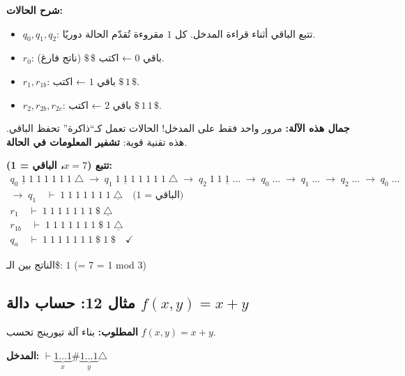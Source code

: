 \documentclass[14pt]{extarticle}
\begin{document}
\textbf{شرح الحالات:}
\begin{itemize}
    \item $q_0, q_1, q_2$: تتبع الباقي أثناء قراءة المدخل. كل $1$ مقروءة تُقدّم الحالة دوريًا.
    \item $r_0$: باقي $0$ ← اكتب $\$\,\$$ (ناتج فارغ).
    \item $r_1, r_{1b}$: باقي $1$ ← اكتب $\$\,1\,\$$.
    \item $r_2, r_{2b}, r_{2c}$: باقي $2$ ← اكتب $\$\,1\,1\,\$$.
\end{itemize}

\begin{boxNote}
\textbf{جمال هذه الآلة:} مرور واحد فقط على المدخل! الحالات تعمل كـ``ذاكرة'' تحفظ الباقي. هذه تقنية قوية: \textbf{تشفير المعلومات في الحالة}.
\end{boxNote}

\textbf{تتبع ($x = 7$، الباقي = 1):}
\begin{align*}
q_0 \; \underline{1} \; 1 \; 1 \; 1 \; 1 \; 1 \; 1 \; \triangle \;\to\;
q_1 \; 1 \; \underline{1} \; 1 \; 1 \; 1 \; 1 \; 1 \; \triangle \;\to\;
q_2 \; 1 \; 1 \; \underline{1} \; \ldots \;\to\;
q_0 \; \ldots \;\to\; q_1 \; \ldots \;\to\; q_2 \; \ldots \;\to\; q_0 \; \ldots \\
\to\; q_1 \quad \vdash \; 1 \; 1 \; 1 \; 1 \; 1 \; 1 \; 1 \; \underline{\triangle} \quad \text{(الباقي = 1)} \\
r_1 \quad \vdash \; 1 \; 1 \; 1 \; 1 \; 1 \; 1 \; 1 \; \$ \; \underline{\triangle} \\
r_{1b} \quad \vdash \; 1 \; 1 \; 1 \; 1 \; 1 \; 1 \; 1 \; \$ \; 1 \; \underline{\triangle} \\
q_a \quad \vdash \; 1 \; 1 \; 1 \; 1 \; 1 \; 1 \; 1 \; \$ \; 1 \; \$ \quad \checkmark
\end{align*}

الناتج بين الـ\$: $1$ (= 1 = 7 mod 3) \checkmark

\clearpage

\subsection{مثال 12: حساب دالة $f(x,y) = x + y$}

\textbf{المطلوب:} بناء آلة تيورينج تحسب $f(x, y) = x + y$.

\textbf{المدخل:} $\vdash \underbrace{1\ldots1}_{x} \# \underbrace{1\ldots1}_{y} \triangle$
\end{document}
